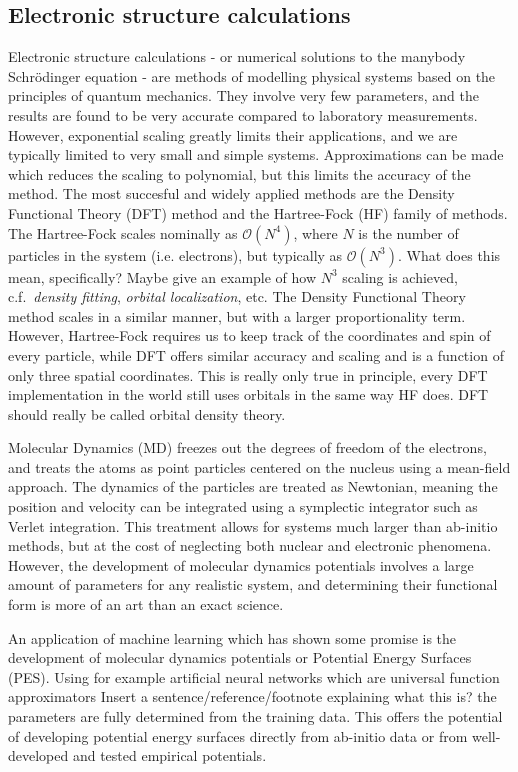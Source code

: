 \subsection{Electronic structure calculations}
Electronic structure calculations - or numerical solutions
to the manybody Schr\"{o}dinger equation - are methods of modelling
physical systems based on the principles of quantum mechanics.
They involve very few parameters, and the results are found
to be very accurate compared to laboratory measurements.
However, exponential scaling greatly limits their applications,
and we are typically limited to very small and simple systems.
Approximations can be made which reduces the scaling
to polynomial, but this limits the accuracy of the method.
The most succesful and widely applied methods
are the Density Functional Theory (DFT) method
and the Hartree-Fock (HF) family of methods.
The Hartree-Fock scales nominally as $\mathcal{O}(N^4)$,
where $N$ is the number of particles in the system
(i.e. electrons), but typically as $\mathcal{O}(N^3)$. {\color{red} What does this mean, specifically? Maybe give an example of how $N^3$ scaling is achieved, c.f.\ \textit{density fitting}, \textit{orbital localization}, etc.}
The Density Functional Theory method scales in a similar
manner, but with a larger proportionality term.
However, Hartree-Fock requires us to keep track of
the coordinates and spin of every particle, while
DFT offers similar accuracy and scaling
and is a function of only three spatial coordinates. {\color{red} This is really only true in principle, every DFT implementation in the world still uses orbitals in the same way HF does. DFT should really be called orbital density theory.}
\par
Molecular Dynamics (MD) freezes out the degrees of freedom of the
electrons, and treats the atoms as point particles centered on
the nucleus using a mean-field approach.
The dynamics of the particles are treated as Newtonian,
meaning the position and velocity can be integrated using a
symplectic integrator such as Verlet integration.
This treatment allows for systems much larger
than ab-initio methods, but at the cost of neglecting
both nuclear and electronic phenomena.
However, the development of molecular dynamics potentials
involves a large amount of parameters for any realistic system,
and determining their functional form is more of an
art than an exact science.
\par
An application of machine learning which has shown some promise
is the development of molecular dynamics potentials
or Potential Energy Surfaces (PES). Using for example
artificial neural networks which are universal function approximators {\color{red} Insert a sentence/reference/footnote explaining what this is?}
the parameters are fully determined from the training data.
This offers the potential of developing potential energy surfaces
directly from ab-initio data or from well-developed and tested
empirical potentials.

